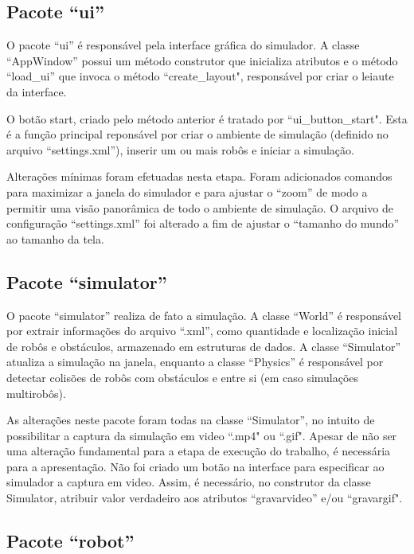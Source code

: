 	\subsection{Pacote ``ui''}
	
	O pacote ``ui'' é responsável pela interface gráfica do simulador. A classe
	``AppWindow'' possui um método construtor que inicializa atributos e o
	método ``load\_ui'' que invoca o método ``create\_layout", responsável por
	criar o leiaute da interface.
	
	O botão start, criado pelo método anterior é tratado por ``ui\_button\_start".
	Esta é a função principal reponsável por criar o ambiente de simulação
	(definido no arquivo ``settings.xml''), inserir um ou mais robôs e iniciar a
	simulação.
	
	Alterações mínimas foram efetuadas nesta etapa. Foram adicionados comandos para
	maximizar a janela do simulador e para ajustar o ``zoom'' de modo a permitir uma
	visão panorâmica de todo o ambiente de simulação. O arquivo de configuração
	``settings.xml'' foi alterado a fim de ajustar o ``tamanho do mundo'' ao
	tamanho da	tela.
	
	\subsection{Pacote ``simulator''}
	
	O pacote ``simulator'' realiza de fato a simulação. A classe ``World'' é
	responsável por extrair informações do arquivo ``.xml'', como quantidade e
	localização inicial de robôs e obstáculos, armazenado em estruturas de dados.
	A classe ``Simulator'' atualiza a simulação na janela, enquanto a
	classe ``Physics'' é responsável por detectar colisões de robôs com obstáculos
	e entre si (em caso simulações multirobôs). 
	
	As alterações neste pacote foram todas na classe ``Simulator'', no intuito
	de possibilitar a captura da simulação em video ``.mp4" ou ``.gif". Apesar de
	não ser uma alteração fundamental para a etapa de execução do trabalho, é
	necessária para a apresentação. Não foi criado um botão na interface para
	especificar ao simulador a captura em video. Assim, é necessário, no
	construtor da classe Simulator, atribuir valor verdadeiro aos atributos
	``gravarvideo'' e/ou ``gravargif". 
	
	\subsection{Pacote ``robot''}
	

